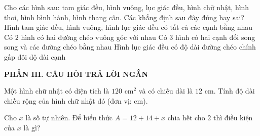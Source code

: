 \documentclass[12pt,a4paper]{article}
\begin{document}
\begin{ex}
Cho các hình sau: tam giác đều, hình vuông, lục giác đều, hình chữ nhật, hình thoi, hình bình hành, hình thang cân. Các khẳng định sau đây đúng hay sai?
\choiceTF
{\True Hình tam giác đều, hình vuông, hình lục giác đều có tất cả các cạnh bằng nhau}
{\True Có $2$ hình có hai đường chéo vuông góc với nhau}
{\True Có $3$ hình có hai cạnh đối song song và các đường chéo bằng nhau}
{\True Hình lục giác đều có độ dài đường chéo chính gấp đôi độ dài cạnh}
\end{ex}


\setcounter{ex}{0}
\noindent\textbf{\large PHẦN III. CÂU HỎI TRẢ LỜI NGẮN}
\vspace{1mm}
\begin{ex}
Một hình chữ nhật có diện tích là $120\text{ cm}^2$ và có chiều dài là $12\text{ cm}$. Tính độ dài chiều rộng của hình chữ nhật đó (đơn vị: cm). 
\end{ex}

\begin{ex}
Cho $x$ là số tự nhiên. Để biểu thức $A = 12 + 14 + x$ chia hết cho $2$ thì điều kiện của $x$ là gì? 
\end{ex}
\end{document}
